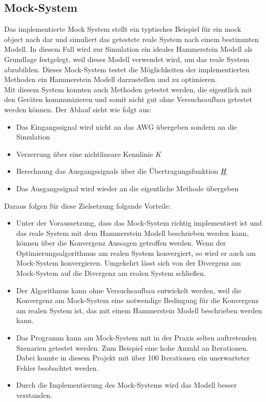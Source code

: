 \documentclass[../Report.tex]{subfiles}
\begin{document}
\subsection{Mock-System}
\label{subsec:code.mock}
Das implementierte Mock System stellt ein typtisches Beispiel für ein mock object nach \cite{mock} dar und simuliert das getestete reale System nach einem bestimmten Modell. In diesem Fall wird zur Simulation ein ideales Hammerstein Modell als Grundlage festgelegt, weil dieses Modell verwendet wird, um das reale System abzubilden. Dieses Mock-System testet die Möglichkeiten der implementierten Methoden ein Hammerstein Modell darzustellen und zu optimieren.\\
Mit diesem System konnten auch Methoden getestet werden, die eigentlich mit den Geräten kommunizieren und somit nicht gut ohne Versuchsaufbau getestet werden können. Der Ablauf sieht wie folgt aus:
\begin{itemize}
	\item Das Eingangssignal wird nicht an das AWG übergeben sondern an die Simulation
	\item Verzerrung über eine nichtlineare Kennlinie $K$ 
	\item Berechnung das Ausgangssignals über die Übertragungsfunktion $\underline{H}$
	\item Das Ausgangssignal wird wieder an die eigentliche Methode übergeben
\end{itemize}
Daraus folgen für diese Zielsetzung folgende Vorteile:
\begin{itemize}
	\item Unter der Voraussetzung, dass das Mock-System richtig implementiert ist und das reale System mit dem Hammerstein Modell beschrieben werden kann, können über die Konvergenz Aussagen getroffen werden. Wenn der Optimierungsalgorithmus am realen System konvergiert, so wird er auch am Mock-System konvergieren. Umgekehrt lässt sich von der Divergenz am Mock-System auf die Divergenz am realen System schließen.
	\item Der Algorithmus kann ohne Versuchsaufbau entwickelt werden, weil die Konvergenz am Mock-System eine notwendige Bedingung für die Konvergenz am realen System ist, das mit einem Hammerstein Modell beschrieben werden kann.
	\item Das Programm kann am Mock-System mit in der Praxis selten auftretenden Szenarien getestet werden. Zum Beispiel eine hohe Anzahl an Iterationen. Dabei konnte in diesem Projekt mit über 100 Iterationen ein unerwarteter Fehler beobachtet werden.
	\item Durch die Implementierung des Mock-Systems wird das Modell besser verstanden.
\end{itemize}
\end{document}
